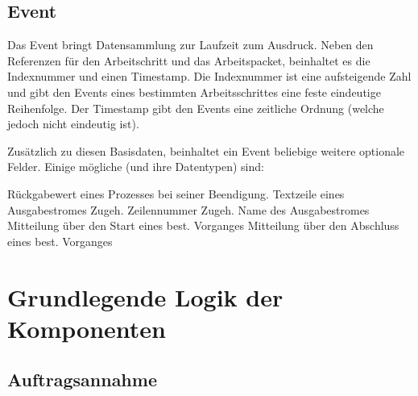 

\subsection{Event}

Das Event bringt Datensammlung zur Laufzeit zum Ausdruck.
Neben den Referenzen f\"ur den Arbeitschritt und das Arbeitspacket,
beinhaltet es die Indexnummer und einen Timestamp.
Die Indexnummer ist eine aufsteigende Zahl
und gibt den Events eines bestimmten Arbeitsschrittes eine feste eindeutige Reihenfolge.
Der Timestamp gibt den Events eine zeitliche Ordnung (welche jedoch nicht eindeutig ist).


Zus\"atzlich zu diesen Basisdaten, beinhaltet ein Event beliebige weitere optionale Felder.
Einige m\"ogliche (und ihre Datentypen) sind:

\begin{description}
     R\"uckgabewert eines Prozesses bei seiner Beendigung.
     Textzeile eines Ausgabestromes
     Zugeh. Zeilennummer
     Zugeh. Name des Ausgabestromes
     Mitteilung \"uber den Start eines best. Vorganges
     Mitteilung \"uber den Abschluss eines best. Vorganges
\end{description}




\section{Grundlegende Logik der Komponenten} %


\subsection{Auftragsannahme}


